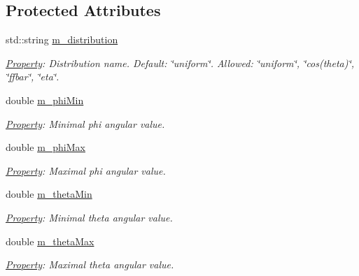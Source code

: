 \subsection*{Protected Attributes}
\begin{DoxyCompactItemize}
\item 
std\+::string \hyperlink{class_d_d4hep_1_1_simulation_1_1_geant4_isotrope_generator_a06a94fc1f4b02b112f0b56ced43b2f6b}{m\+\_\+distribution}
\begin{DoxyCompactList}\small\item\em \hyperlink{class_d_d4hep_1_1_property}{Property}\+: Distribution name. Default\+: \char`\"{}uniform\char`\"{}. Allowed\+: \char`\"{}uniform\char`\"{}, \char`\"{}cos(theta)\char`\"{}, \char`\"{}ffbar\char`\"{}, \char`\"{}eta\char`\"{}. \end{DoxyCompactList}\item 
double \hyperlink{class_d_d4hep_1_1_simulation_1_1_geant4_isotrope_generator_a87bd2c08ac991fe265d7a88d96edec48}{m\+\_\+phi\+Min}
\begin{DoxyCompactList}\small\item\em \hyperlink{class_d_d4hep_1_1_property}{Property}\+: Minimal phi angular value. \end{DoxyCompactList}\item 
double \hyperlink{class_d_d4hep_1_1_simulation_1_1_geant4_isotrope_generator_a72d8e77fc0bb2c1160d2266c02fa82ef}{m\+\_\+phi\+Max}
\begin{DoxyCompactList}\small\item\em \hyperlink{class_d_d4hep_1_1_property}{Property}\+: Maximal phi angular value. \end{DoxyCompactList}\item 
double \hyperlink{class_d_d4hep_1_1_simulation_1_1_geant4_isotrope_generator_adc75b47a005e8632d01d3db7b408de4c}{m\+\_\+theta\+Min}
\begin{DoxyCompactList}\small\item\em \hyperlink{class_d_d4hep_1_1_property}{Property}\+: Minimal theta angular value. \end{DoxyCompactList}\item 
double \hyperlink{class_d_d4hep_1_1_simulation_1_1_geant4_isotrope_generator_a0e42113b732249962b03bb340f69b0a6}{m\+\_\+theta\+Max}
\begin{DoxyCompactList}\small\item\em \hyperlink{class_d_d4hep_1_1_property}{Property}\+: Maximal theta angular value. \end{DoxyCompactList}\end{DoxyCompactItemize}
